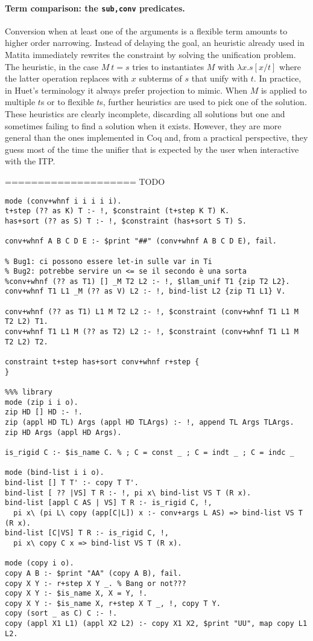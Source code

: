 \documentclass{easychair}
\begin{document}
\paragraph{Term comparison: the \texttt{sub,conv} predicates.}

Conversion when at least one of the arguments is a flexible term amounts to higher order narrowing. Instead of delaying the goal, an heuristic already used in Matita immediately rewrites the constraint by solving the unification problem. The heuristic, in the case $M~t = s$ tries to instantiates $M$ with
$\lambda x. s[x/t]$ where the latter operation replaces with $x$ subterms of $s$ that unify with $t$. In practice, in Huet's terminology it always prefer projection to mimic. When $M$ is applied to multiple $t$s or to flexible $t$s, further heuristics are used to pick one of the solution. These heuristics are clearly incomplete, discarding all solutions but one and sometimes failing to find a solution when it exists. However, they are more general than the ones implemented in Coq and, from a practical perspective, they guess most of the time the unifier that is expected by the user when interactive with the ITP.

==================== TODO

\begin{verbatim}
mode (conv+whnf i i i i i).
t+step (?? as K) T :- !, $constraint (t+step K T) K.
has+sort (?? as S) T :- !, $constraint (has+sort S T) S.

conv+whnf A B C D E :- $print "##" (conv+whnf A B C D E), fail.

% Bug1: ci possono essere let-in sulle var in Ti
% Bug2: potrebbe servire un <= se il secondo è una sorta
%conv+whnf (?? as T1) [] _M T2 L2 :- !, $llam_unif T1 {zip T2 L2}.
conv+whnf T1 L1 _M (?? as V) L2 :- !, bind-list L2 {zip T1 L1} V.

conv+whnf (?? as T1) L1 M T2 L2 :- !, $constraint (conv+whnf T1 L1 M T2 L2) T1.
conv+whnf T1 L1 M (?? as T2) L2 :- !, $constraint (conv+whnf T1 L1 M T2 L2) T2.

constraint t+step has+sort conv+whnf r+step {
}

%%% library
mode (zip i i o).
zip HD [] HD :- !.
zip (appl HD TL) Args (appl HD TLArgs) :- !, append TL Args TLArgs.
zip HD Args (appl HD Args).

is_rigid C :- $is_name C. % ; C = const _ ; C = indt _ ; C = indc _

mode (bind-list i i o).
bind-list [] T T' :- copy T T'.
bind-list [ ?? |VS] T R :- !, pi x\ bind-list VS T (R x).
bind-list [appl C AS | VS] T R :- is_rigid C, !,
  pi x\ (pi L\ copy (app[C|L]) x :- conv+args L AS) => bind-list VS T (R x).
bind-list [C|VS] T R :- is_rigid C, !,
  pi x\ copy C x => bind-list VS T (R x).

mode (copy i o).
copy A B :- $print "AA" (copy A B), fail.
copy X Y :- r+step X Y _. % Bang or not???
copy X Y :- $is_name X, X = Y, !.
copy X Y :- $is_name X, r+step X T _, !, copy T Y.
copy (sort _ as C) C :- !.
copy (appl X1 L1) (appl X2 L2) :- copy X1 X2, $print "UU", map copy L1 L2.
\end{verbatim}
\end{document}

